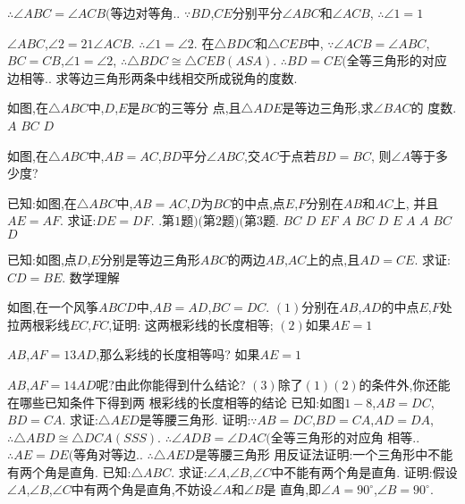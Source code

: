 \documentclass[cn,blue,12pt]{elegantbook}
\begin{document}
\begin{liti}[resume]
\( \therefore \angle ABC = \angle ACB( \)等边对等角.. 
\( \because BD\),\( CE \)分别平分\( \angle ABC \)和\( \angle ACB\),
\( \therefore \angle  1 = 1\)
\item \( \angle  ABC\),\( \angle  2 = 21 \angle  ACB\). 
\( \therefore \angle  1 =  \angle  2\). 
在\( \triangle BDC \)和\( \triangle CEB \)中,
\( \because \angle  ACB =  \angle  ABC\),\( BC = CB\),\( \angle  1 =  \angle  2\),
\( \therefore \triangle BDC \cong  \triangle CEB( ASA) \). 
\( \therefore BD = CE( \)全等三角形的对应边相等.. 
求等边三角形两条中线相交所成锐角的度数. 
\item 如图,在\( \triangle ABC \)中,\( D\),\( E \)是\( BC \)的三等分
点,且\( \triangle ADE \)是等边三角形,求\( \angle BAC \)的
度数. 
\(A\)
\(B C\)
\(D \)
\item 如图,在\( \triangle ABC \)中,\( AB = AC\),\( BD \)平分\( \angle ABC\),交\( AC \)于点\task 若\( BD = BC\),
则\( \angle A \)等于多少度?
\item 已知:如图,在\( \triangle ABC \)中,\( AB = AC\),\( D \)为\( BC \)的中点,点\( E\),\( F \)分别在\( AB \)和\( AC \)上,
并且\( AE = AF\). 求证:\( DE = DF\). 
.第\( 1 \)题\() ( \)第\( 2 \)题\() ( \)第\( 3 \)题.
\(B C\)
\(D\)
\(E F\)
\(A\)
\(B C\)
\(D\)
\(E\)
\(A\)
\(A\)
\(B C\)
\(D\)
\item 已知:如图,点\( D\),\( E \)分别是等边三角形\( ABC \)的两边\( AB\),\( AC \)上的点,且\( AD = CE\). 
求证:\( CD = BE\). 
数学理解
\item 如图,在一个风筝\( ABCD \)中,\( AB = AD\),\( BC = DC\). 
\(( 1) \)分别在\( AB\),\( AD \)的中点\( E\),\( F \)处拉两根彩线\( EC\),\( FC\),证明:
这两根彩线的长度相等;
\(( 2) \)如果\( AE = 1\)
\item \( AB\),\( AF = 1 3 AD\),那么彩线的长度相等吗?
如果\( AE = 1\)
\item \( AB\),\( AF = 1 4 AD \)呢?由此你能得到什么结论?
\(( 3) \)除了\(( 1)( 2) \)的条件外,你还能在哪些已知条件下得到两
根彩线的长度相等的结论
已知:如图\( 1-8\),\( AB = DC\),\( BD = CA\). 
求证:\( \triangle AED \)是等腰三角形. 
证明:\( \because AB = DC\),\( BD = CA\),\( AD = DA\),
\( \therefore \triangle ABD \cong  \triangle DCA( SSS) \). 
\( \therefore \angle ADB = \angle DAC( \)全等三角形的对应角
相等.. 
\( \therefore AE = DE( \)等角对等边.. 
\( \therefore \triangle AED \)是等腰三角形
用反证法证明:一个三角形中不能有两个角是直角. 
已知:\( \triangle ABC\). 
求证:\( \angle A\),\( \angle B\),\( \angle C \)中不能有两个角是直角. 
证明:假设\( \angle A\),\( \angle B\),\( \angle C \)中有两个角是直角,不妨设\( \angle A \)和\( \angle B \)是
直角,即\( \angle A = 90 ^\circ \),\( \angle B = 90 ^\circ \). 

\end{liti}
\end{document}
